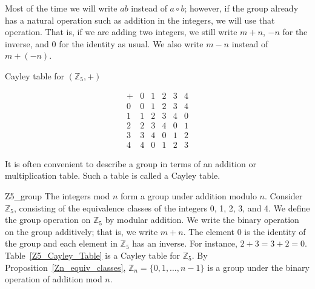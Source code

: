 Most of the time we will write $ab$ instead of $a \circ b$; however, if the group already has a natural operation such as addition in the integers, we will use that operation.  That is, if we are adding two integers, we still write $m + n$, $-n$ for the inverse, and 0 for the identity as usual. We also write $m - n$ instead of $m + (-n)$.

\begin{table}[htb]
\caption{Cayley table for $({\mathbb Z}_5, +)$}{\small
\[
\begin{array}{c|ccccc}
+ & 0 & 1 & 2 & 3 & 4 \\
\hline
0 & 0 & 1 & 2 & 3 & 4 \\
1 & 1 & 2 & 3 & 4 & 0 \\
2 & 2 & 3 & 4 & 0 & 1 \\
3 & 3 & 4 & 0 & 1 & 2 \\
4 & 4 & 0 & 1 & 2 & 3
\end{array}
\]\label{Z5_Cayley_Table}
}
\end{table}
 
It is often convenient to describe a group in terms of an addition or multiplication table.  Such a table is called a {\bfi Cayley table}.

\medskip
 
\begin{example}{Z5_group}
The integers mod $n$ form a group under addition modulo $n$.  Consider ${\mathbb Z}_5$, consisting of the equivalence classes of the integers 0, 1, 2, 3, and 4.  We define the group operation on ${\mathbb Z}_5$ by modular addition.  We write the binary operation on the group additively; that is, we write $m + n$.  The element 0 is the identity of the group and each element in ${\mathbb Z}_5$ has an inverse. For instance, $2 + 3 = 3 + 2 = 0$.  Table~\ref{Z5_Cayley_Table} is a Cayley table for ${\mathbb Z}_5$.  By Proposition~\ref{Zn_equiv_classes}, ${\mathbb Z}_n = \{0, 1, \ldots, n-1 \}$ is a group under the binary operation of addition mod $n$.  
\end{example}

